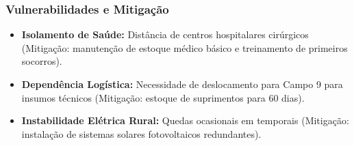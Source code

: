 \subsubsection{Vulnerabilidades e
Mitigação}

\begin{itemize}
\tightlist
\item
  \textbf{Isolamento de Saúde:} Distância de centros hospitalares
  cirúrgicos (Mitigação: manutenção de estoque médico básico e
  treinamento de primeiros socorros).
\item
  \textbf{Dependência Logística:} Necessidade de deslocamento para Campo
  9 para insumos técnicos (Mitigação: estoque de suprimentos para 60
  dias).
\item
  \textbf{Instabilidade Elétrica Rural:} Quedas ocasionais em temporais
  (Mitigação: instalação de sistemas solares fotovoltaicos redundantes).
\end{itemize}

